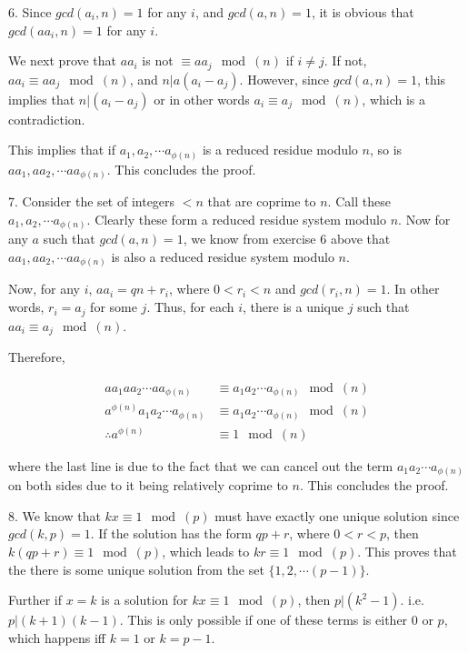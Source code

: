 \documentclass{article}
\begin{document}
6. Since $gcd(a_i, n) = 1$ for any $i$, and $gcd(a, n) = 1$, it is obvious that $gcd(aa_i, n) = 1$ for any $i$.

We next prove that $aa_i$ is not $\equiv aa_j \mod(n)$ if $i \ne j$. If not, $aa_i \equiv aa_j \mod(n)$, and $n | a(a_i - a_j)$. However, since $gcd(a, n) = 1$, this implies that $n | (a_i - a_j)$ or in other words $a_i \equiv a_j \mod(n)$, which is a contradiction.

This implies that if $a_1, a_2, \cdots a_{\phi(n)}$ is a reduced residue modulo $n$, so is $aa_1, aa_2, \cdots aa_{\phi(n)}$. This concludes the proof.

7. Consider the set of integers $< n$ that are coprime to $n$. Call these $a_1, a_2, \cdots a_{\phi(n)}$. Clearly these form a reduced residue system modulo $n$. Now for any $a$ such that $gcd(a, n) = 1$, we know from exercise 6 above that $aa_1, aa_2, \cdots aa_{\phi(n)}$ is also a reduced residue system modulo $n$.

Now, for any $i$, $aa_i = qn + r_i$, where $0 < r_i < n$ and $gcd(r_i, n) = 1$. In other words, $r_i = a_j$ for some $j$. Thus, for each $i$, there is a unique $j$ such that $aa_i \equiv a_j \mod(n)$.

Therefore,

\begin{align*}
    aa_1 aa_2 \cdots aa_{\phi(n)} & \equiv a_1 a_2 \cdots a_{\phi(n)} \mod(n) \\
    a^{\phi(n)} a_1 a_2 \cdots a_{\phi(n)} & \equiv a_1 a_2 \cdots a_{\phi(n)} \mod(n) \\
    \therefore a^{\phi(n)} & \equiv 1 \mod(n)
\end{align*}

where the last line is due to the fact that we can cancel out the term $a_1 a_2 \cdots a_{\phi(n)}$ on both sides due to it being relatively coprime to $n$. This concludes the proof. 

8. We know that $kx \equiv 1 \mod(p)$ must have exactly one unique solution since $gcd(k, p) = 1$. If the solution has the form $qp + r$, where $0 < r < p$, then $k(qp + r) \equiv 1 \mod(p)$, which leads to $kr \equiv 1 \mod(p)$. This proves that the there is some unique solution from the set $\{1, 2, \cdots (p - 1)\}$.

Further if $x = k$ is a solution for $kx \equiv 1 \mod(p)$, then $p | (k^2 - 1)$. i.e. $p | (k + 1)(k - 1)$. This is only possible if one of these terms is either $0$ or $p$, which happens iff $k = 1$ or $k = p - 1$.
\end{document}
